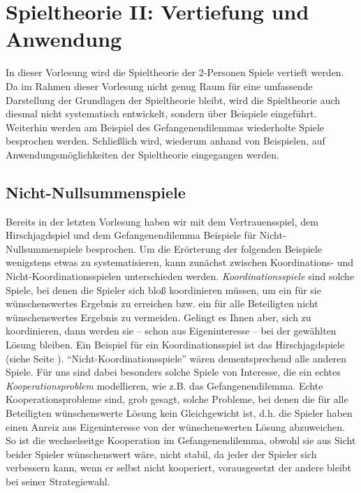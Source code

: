 \section{Spieltheorie II: Vertiefung und Anwendung}

In dieser Vorlesung wird die Spieltheorie der 2-Personen Spiele vertieft
werden. Da im Rahmen dieser Vorlesung nicht genug Raum für eine umfassende 
Darstellung der Grundlagen der Spieltheorie bleibt, wird die
Spieltheorie auch diesmal nicht systematisch entwickelt, sondern über Beispiele
eingeführt. Weiterhin werden am Beispiel des Gefangenendilemmas wiederholte
Spiele besprochen werden. Schließlich wird, wiederum anhand von Beispielen, auf
Anwendungsmöglichkeiten der Spieltheorie eingegangen werden.

\subsection{Nicht-Nullsummenspiele}

Bereits in der letzten Vorlesung haben wir mit dem Ver\-trauens\-spiel, dem
Hirsch\-jagd\-spiel und dem Gefangenendilemma Beispiele für
Nicht-Nullsummenspiele besprochen. Um die Erörterung der folgenden Beispiele
wenigstens etwas zu systematisieren, kann zunächst zwischen Koordinations- und
Nicht-Koordinationsspielen unterschieden werden. {\em Koordinationsspiele} sind
solche Spiele, bei denen die Spieler sich bloß koordinieren müssen, um ein für
sie wünschenswertes Ergebnis zu erreichen bzw. ein für alle Beteiligten nicht
wünschenswertes Ergebnis zu vermeiden. Gelingt es Ihnen aber, sich zu
koordinieren, dann werden sie -- schon aus Eigeninteresse -- bei der gewählten
Lösung bleiben. Ein Beispiel für ein Koordinationsspiel ist das
Hirschjagdspiele (siehe Seite \pageref{Hirschjagdspiel}).
"`Nicht-Koordinationsspiele"' wären dementsprechend alle anderen Spiele. Für
uns sind dabei besonders solche Spiele von Interesse, die ein echtes {\em
Kooperationsproblem} modellieren, wie z.B. das Gefangenendilemma. Echte
Kooperationsprobleme sind, grob gesagt, solche Probleme, bei denen die für alle
Beteiligten wünschenswerte Lösung kein Gleichgewicht ist, d.h. die Spieler
haben einen Anreiz aus Eigeninteresse von der wünschenswerten Lösung 
abzuweichen. So ist die wechselseitge Kooperation im Gefangenendilemma,
obwohl sie aus Sicht beider Spieler wünschenswert wäre, nicht stabil, da jeder
der Spieler sich verbessern kann, wenn er selbst nicht kooperiert, 
vorausgesetzt der andere bleibt bei
seiner Strategiewahl.

